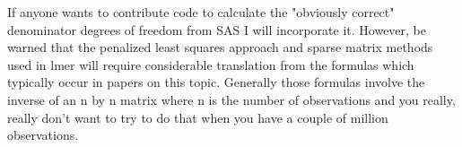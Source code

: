 If anyone wants to contribute code to calculate the "obviously
correct" denominator degrees of freedom from SAS I will incorporate
it.  However, be warned that the penalized least squares approach and
sparse matrix methods used in lmer will require considerable
translation from the formulas which typically occur in papers on this
topic.  Generally those formulas involve the inverse of an n by n
matrix where n is the number of observations and you really, really
don't want to try to do that when you have a couple of million
observations.
